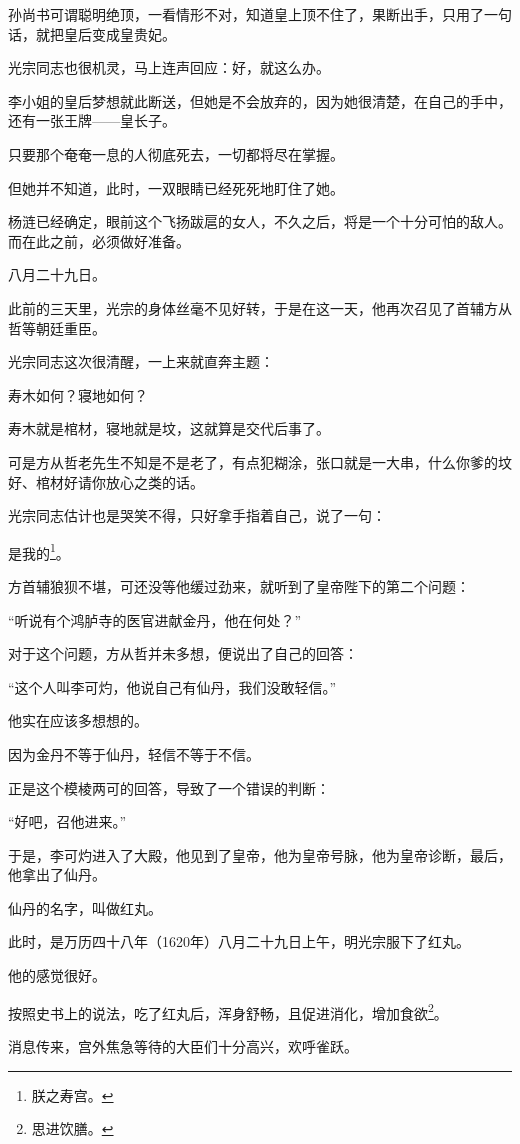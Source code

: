 \begin{multicols}{\theparacolNo}
孙尚书可谓聪明绝顶，一看情形不对，知道皇上顶不住了，果断出手，只用了一句话，就把皇后变成皇贵妃。

光宗同志也很机灵，马上连声回应：好，就这么办。

李小姐的皇后梦想就此断送，但她是不会放弃的，因为她很清楚，在自己的手中，还有一张王牌——皇长子。

只要那个奄奄一息的人彻底死去，一切都将尽在掌握。

但她并不知道，此时，一双眼睛已经死死地盯住了她。

杨涟已经确定，眼前这个飞扬跋扈的女人，不久之后，将是一个十分可怕的敌人。而在此之前，必须做好准备。

八月二十九日。

此前的三天里，光宗的身体丝毫不见好转，于是在这一天，他再次召见了首辅方从哲等朝廷重臣。

光宗同志这次很清醒，一上来就直奔主题：

寿木如何？寝地如何？

寿木就是棺材，寝地就是坟，这就算是交代后事了。

可是方从哲老先生不知是不是老了，有点犯糊涂，张口就是一大串，什么你爹的坟好、棺材好请你放心之类的话。

光宗同志估计也是哭笑不得，只好拿手指着自己，说了一句：

是我的\footnote{朕之寿宫。}。

方首辅狼狈不堪，可还没等他缓过劲来，就听到了皇帝陛下的第二个问题：

“听说有个鸿胪寺的医官进献金丹，他在何处？”

对于这个问题，方从哲并未多想，便说出了自己的回答：

“这个人叫李可灼，他说自己有仙丹，我们没敢轻信。”

他实在应该多想想的。

因为金丹不等于仙丹，轻信不等于不信。

正是这个模棱两可的回答，导致了一个错误的判断：

“好吧，召他进来。”

于是，李可灼进入了大殿，他见到了皇帝，他为皇帝号脉，他为皇帝诊断，最后，他拿出了仙丹。

仙丹的名字，叫做红丸。

此时，是万历四十八年（1620年）八月二十九日上午，明光宗服下了红丸。

他的感觉很好。

按照史书上的说法，吃了红丸后，浑身舒畅，且促进消化，增加食欲\footnote{思进饮膳。}。

消息传来，宫外焦急等待的大臣们十分高兴，欢呼雀跃。


\end{multicols}
